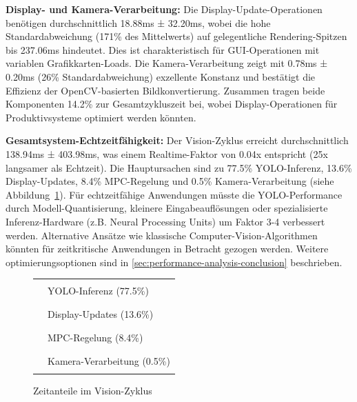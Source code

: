 \textbf{Display- und Kamera-Verarbeitung:} Die Display-Update-Operationen benötigen durchschnittlich 18.88ms ± 32.20ms, 
wobei die hohe Standardabweichung (171\% des Mittelwerts) auf gelegentliche Rendering-Spitzen bis 237.06ms hindeutet. 
Dies ist charakteristisch für GUI-Operationen mit variablen Grafikkarten-Loads. Die Kamera-Verarbeitung zeigt mit 
0.78ms ± 0.20ms (26\% Standardabweichung) exzellente Konstanz und bestätigt die Effizienz der OpenCV-basierten 
Bildkonvertierung. Zusammen tragen beide Komponenten 14.2\% zur Gesamtzykluszeit bei, wobei Display-Operationen für 
Produktivsysteme optimiert werden könnten.

\begin{minipage}[t]{0.48\textwidth}
\textbf{Gesamtsystem-Echtzeitfähigkeit:} Der Vision-Zyklus erreicht durchschnittlich 138.94ms ± 403.98ms, was einem 
Realtime-Faktor von 0.04x entspricht (25x langsamer als Echtzeit). Die Hauptursachen sind zu 77.5\% YOLO-Inferenz, 
13.6\% Display-Updates, 8.4\% MPC-Regelung und 0.5\% Kamera-Verarbeitung (siehe Abbildung~\ref{fig:vision-cycle-breakdown}). Für echtzeitfähige Anwendungen müsste die 
YOLO-Performance durch Modell-Quantisierung, kleinere Eingabeauflösungen oder spezialisierte Inferenz-Hardware (z.B. 
Neural Processing Units) um Faktor 3-4 verbessert werden. Alternative Ansätze wie klassische Computer-Vision-Algorithmen 
könnten für zeitkritische Anwendungen in Betracht gezogen werden. Weitere optimierungsoptionen sind in \ref{sec:performance-analysis-conclusion} beschrieben.


\end{minipage}%
\hfill
\begin{minipage}[t]{0.48\textwidth}
\begin{figure}[H]
\centering
{}

\vspace{0.3cm}
\begin{tabular}{ll}
\textcolor{red!70}{\rule{0.3cm}{0.3cm}} & YOLO-Inferenz (77.5\%) \\
\textcolor{orange!70}{\rule{0.3cm}{0.3cm}} & Display-Updates (13.6\%) \\
\textcolor{blue!70}{\rule{0.3cm}{0.3cm}} & MPC-Regelung (8.4\%) \\
\textcolor{green!70}{\rule{0.3cm}{0.3cm}} & Kamera-Verarbeitung (0.5\%) \\
\end{tabular}
\caption{Zeitanteile im Vision-Zyklus}
\label{fig:vision-cycle-breakdown}
\end{figure}
\end{minipage}

